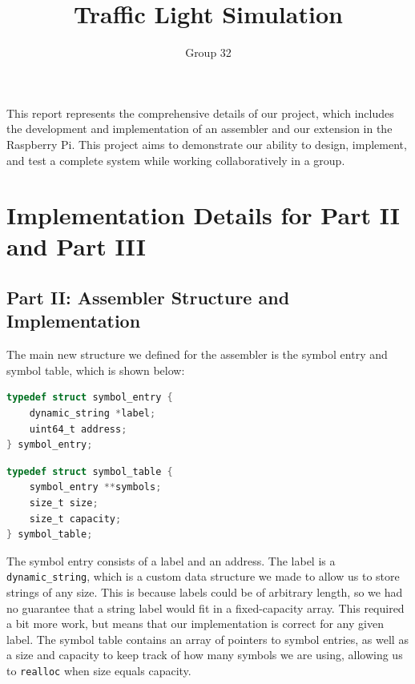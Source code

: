 \documentclass{article}
\begin{document}
\title{Traffic Light Simulation}
\author{Group 32}

\maketitle

This report represents the comprehensive details of our project, which includes the development and implementation of an assembler and our extension in the Raspberry Pi. This project aims to demonstrate our ability to design, implement, and test a complete system while working collaboratively in a group.

\section{Implementation Details for Part II and Part III}

\subsection{Part II: Assembler Structure and Implementation}
The main new structure we defined for the assembler is the symbol entry and symbol table, which is shown below:



\begin{minipage}{0.45\textwidth}
\begin{lstlisting}[language=C, caption=Symbol Entry]
typedef struct symbol_entry {
    dynamic_string *label;
    uint64_t address;
} symbol_entry;
\end{lstlisting}
\end{minipage}
\hfill
\begin{minipage}{0.45\textwidth}
\begin{lstlisting}[language=C, caption=Symbol Table]
typedef struct symbol_table {
    symbol_entry **symbols;
    size_t size;
    size_t capacity;
} symbol_table;

\end{lstlisting}
\end{minipage}

The symbol entry consists of a label and an address. The label is a \verb|dynamic_string|, which is a custom data structure we made to allow us to store strings of any size. This is because labels could be of arbitrary length, so we had no guarantee that a string label would fit in a fixed-capacity array. This required a bit more work, but means that our implementation is correct for any given label. The symbol table contains an array of pointers to symbol entries, as well as a size and capacity to keep track of how many symbols we are using, allowing us to \verb|realloc| when size equals capacity. 
\end{document}
